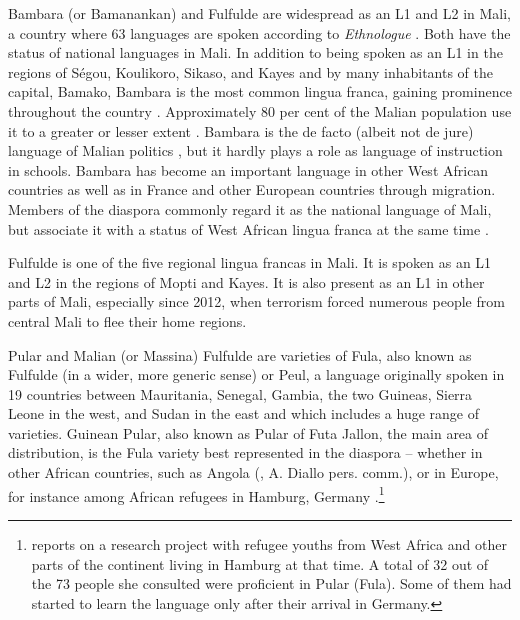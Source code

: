 \documentclass[output=paper]{langscibook}
\begin{document}
Bambara (or Bamanankan) and Fulfulde are widespread as an L1 and L2 in Mali, a country where 63 languages are spoken according to \textit{Ethnologue} \citep{eberhard_ethnologue_2021}. Both have the status of national languages in Mali. In addition to being spoken as an L1 in the regions of Ségou, Koulikoro, Sikaso, and Kayes and by many inhabitants of the capital, Bamako, Bambara is the most common lingua franca, gaining prominence throughout the country \citep{cisse_langues_2020, dumestre_strategies_1994,dumestre_bambara_1998}. Approximately 80 per cent of the Malian population use it to a greater or lesser extent \citep{eberhard_ethnologue_2021}. Bambara is the de facto (albeit not de jure) language of Malian politics \citep{cisse_langues_2020, dumestre_dynamique_1994}, but it hardly plays a role as language of instruction in schools. Bambara has become an important language in other West African countries as well as in France and other European countries through migration. Members of the diaspora commonly regard it as the national language of Mali, but associate it with a status of West African lingua franca at the same time \citep{galtier_dynamique_1995,van_den_avenne_bambara_1998,van_den_avenne_experience_2001,van_den_avenne_changer_2004}. 

Fulfulde is one of the five regional lingua francas in Mali. It is spoken as an L1 and L2 in the regions of Mopti and Kayes. It is also present as an L1 in other parts of Mali, especially since 2012, when terrorism forced numerous people from central Mali to flee their home regions. 

Pular and Malian (or Massina) Fulfulde are varieties of Fula, also known as Fulfulde (in a wider, more generic sense) or Peul, a language originally spoken in 19 countries between Mauritania, Senegal, Gambia, the two Guineas, Sierra Leone in the west, and Sudan in the east and which includes a huge range of varieties. Guinean Pular, also known as Pular of Futa Jallon, the main area of distribution, is the Fula variety best represented in the diaspora \citep{mohamadou_presentation_2017} – whether in other African countries, such as Angola (\citealt[336, 339]{niedrig_bildungsinstitutionen_2003}, A. Diallo pers. comm.), or in Europe, for instance among African refugees in Hamburg, Germany \citep[336, 339]{niedrig_bildungsinstitutionen_2003}.\footnote{\citet{niedrig_bildungsinstitutionen_2003} reports on a research project with refugee youths from West Africa and other parts of the continent living in Hamburg at that time. A total of 32 out of the 73 people she consulted were proficient in Pular (Fula). Some of them had started to learn the language only after their arrival in Germany.} 
\end{document}
